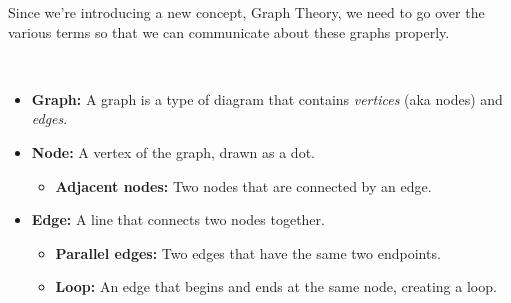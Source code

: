 \documentclass[a4paper,12pt]{book}
\begin{document}
        Since we're introducing a new concept, Graph Theory,
        we need to go over the various terms so that we
        can communicate about these graphs properly.

        \begin{intro}{\ }
            \begin{itemize}
                \item   \textbf{Graph:} A graph is a type of diagram that contains \textit{vertices} (aka nodes) and \textit{edges}.

                \begin{center}
                \end{center}

                \item   \textbf{Node:} A vertex of the graph, drawn as a dot.
                    \begin{itemize}
                        \item   \textbf{Adjacent nodes:} Two nodes that are connected by an edge.
                    \end{itemize}

                \item   \textbf{Edge:} A line that connects two nodes together.
                    \begin{itemize}
                        \item   \textbf{Parallel edges:} Two edges that have
                            the same two endpoints.
                        \item   \textbf{Loop:} An edge that begins and ends at
                            the same node, creating a loop.
                    \end{itemize}

                \begin{center}
\end{center}
\end{itemize}
\end{intro}
\end{document}

